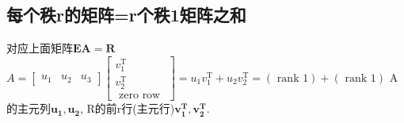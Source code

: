     \subsection{每个秩r的矩阵=r个秩1矩阵之和}
    对应上面矩阵$\boldsymbol{E} \boldsymbol{A}=\boldsymbol{R}$\\
    $A=\left[\begin{array}{lll}{u_{1}} & {u_{2}} & {u_{3}}\end{array}\right]\left[\begin{array}{c}{v_{1}^{\mathrm{T}}} \\ {v_{2}^{\mathrm{T}}} \\ {\text { zero row }}\end{array}\right]=u_{1} v_{1}^{\mathrm{T}}+u_{2} v_{2}^{\mathrm{T}}=(\text { rank } 1)+(\text { rank } 1)$
    A的主元列$\bm{u_1,u_2}$, R的前r行(主元行)$\bm{v_{1}^{T}, v_{2}^{T}}$.\\